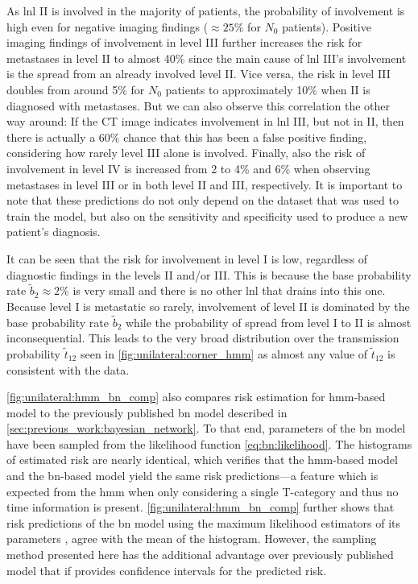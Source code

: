 \documentclass[\relativeRoot/main.tex]{subfiles}
\begin{document}
As \gls{lnl} II is involved in the majority of patients, the probability of involvement is high even for negative imaging findings ($\approx 25\%$ for $N_0$ patients). Positive imaging findings of involvement in level III further increases the risk for metastases in level II to almost 40\% since the main cause of \gls{lnl} III's involvement is the spread from an already involved level II. Vice versa, the risk in level III doubles from around 5\% for $N_0$ patients to approximately 10\% when II is diagnosed with metastases. But we can also observe this correlation the other way around: If the CT image indicates involvement in \gls{lnl} III, but not in II, then there is actually a 60\% chance that this has been a false positive finding, considering how rarely level III alone is involved. Finally, also the risk of involvement in level IV is increased from 2 to 4\% and 6\% when observing metastases in level III or in both level II and III, respectively. It is important to note that these predictions do not only depend on the dataset that was used to train the model, but also on the sensitivity and specificity used to produce a new patient's diagnosis.

It can be seen that the risk for involvement in level I is low, regardless of diagnostic findings in the levels II and/or III. This is because the base probability rate $\tilde{b}_2 \approx 2\%$ is very small and there is no other \gls{lnl} that drains into this one. Because level I is metastatic so rarely, involvement of level II is dominated by the base probability rate $\tilde{b}_2$ while the probability of spread from level I to II is almost inconsequential. This leads to the very broad distribution over the transmission probability $\tilde{t}_{12}$ seen in \cref{fig:unilateral:corner_hmm} as almost any value of $\tilde{t}_{12}$ is consistent with the data.

\cref{fig:unilateral:hmm_bn_comp} also compares risk estimation for \gls{hmm}-based model to the previously published \gls{bn} model \cite{pouymayou_bayesian_2019} described in \cref{sec:previous_work:bayesian_network}. To that end, parameters of the \gls{bn} model have been sampled from the likelihood function \cref{eq:bn:likelihood}. The histograms of estimated risk are nearly identical, which verifies that the \gls{hmm}-based model and the \gls{bn}-based model yield the same risk predictions—a feature which is expected from the \gls{hmm} when only considering a single T-category and thus no time information is present. \cref{fig:unilateral:hmm_bn_comp} further shows that risk predictions of the \gls{bn} model using the maximum likelihood estimators of its parameters \cite{pouymayou_bayesian_2019}, agree with the mean of the histogram. However, the sampling method presented here has the additional advantage over previously published model that if provides confidence intervals for the predicted risk.
\end{document}
